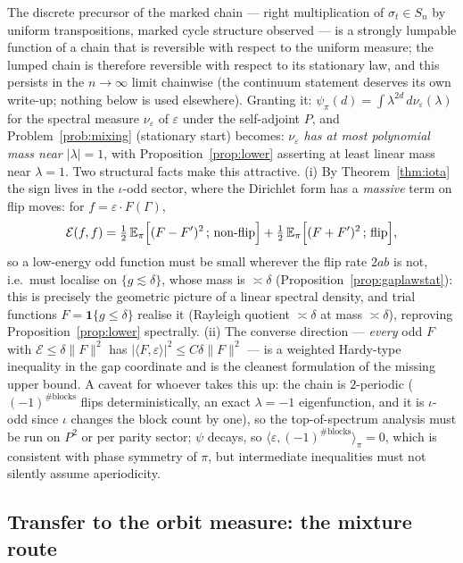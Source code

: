 The discrete precursor of the marked chain --- right multiplication
of $\sigma_t\in S_n$ by uniform transpositions, marked cycle
structure observed --- is a strongly lumpable function of a chain
that is reversible with respect to the uniform measure; the lumped
chain is therefore reversible with respect to its stationary law, and
this persists in the $n\to\infty$ limit chainwise (the continuum
statement deserves its own write-up; nothing below is used elsewhere).
Granting it: $\psi_\pi(d)=\int\lambda^{2d}\,d\nu_\varepsilon(\lambda)$
for the spectral measure $\nu_\varepsilon$ of $\varepsilon$ under the
self-adjoint $P$, and Problem~\ref{prob:mixing} (stationary start)
becomes: \emph{$\nu_\varepsilon$ has at most polynomial mass near
$|\lambda|=1$}, with Proposition~\ref{prop:lower} asserting at least
linear mass near $\lambda=1$.  Two structural facts make this
attractive.  (i) By Theorem~\ref{thm:iota} the sign lives in the
$\iota$-odd sector, where the Dirichlet form has a \emph{massive}
term on flip moves: for $f=\varepsilon\cdot F(\Gamma)$,
\[
\mathcal{E}(f,f)=\tfrac12\,\mathbb{E}_\pi\Bigl[(F-F')^2\,;\,\text{non-flip}
\Bigr]+\tfrac12\,\mathbb{E}_\pi\Bigl[(F+F')^2\,;\,\text{flip}\Bigr],
\]
so a low-energy odd function must be small wherever the flip rate
$2ab$ is not, i.e.\ must localise on $\{g\lesssim\delta\}$, whose
mass is $\asymp\delta$ (Proposition~\ref{prop:gaplawstat}): this is
precisely the geometric picture of a linear spectral density, and
trial functions $F=\mathbf{1}\{g\le\delta\}$ realise it (Rayleigh
quotient $\asymp\delta$ at mass $\asymp\delta$), reproving
Proposition~\ref{prop:lower} spectrally.  (ii) The converse direction
--- \emph{every} odd $F$ with
$\mathcal{E}\le\delta\|F\|^2$ has
$|\langle F,\varepsilon\rangle|^2\le C\delta\|F\|^2$ --- is a
weighted Hardy-type inequality in the gap coordinate and is the
cleanest formulation of the missing upper bound.  A caveat for
whoever takes this up: the chain is $2$-periodic
($(-1)^{\#\mathrm{blocks}}$ flips deterministically, an exact
$\lambda=-1$ eigenfunction, and it is $\iota$-odd since $\iota$
changes the block count by one), so the top-of-spectrum analysis must
be run on $P^2$ or per parity sector; $\psi$ decays, so
$\langle\varepsilon,(-1)^{\#\mathrm{blocks}}\rangle_\pi=0$, which is
consistent with phase symmetry of $\pi$, but intermediate
inequalities must not silently assume aperiodicity.

\subsection{Transfer to the orbit measure: the mixture route}
\label{sec:transfer}

